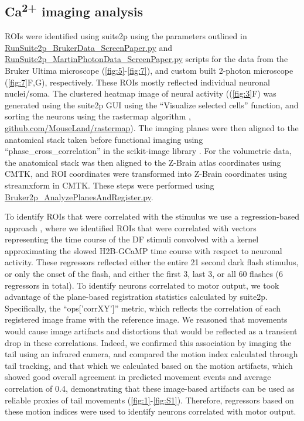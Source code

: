 \documentclass[9pt,lineno]{RandlettLab_elife}
\begin{document}
\subsection{Ca\textsuperscript{2+} imaging analysis}

ROIs were identified using suite2p \citep{Pachitariu2017-ad} using the parameters outlined in 
\\ \href{https://github.com/owenrandlett/lamire_2022/blob/main/RunSuite2p_BrukerData_ScreenPaper.py}{RunSuite2p\_BrukerData\_ScreenPaper.py} and  \href{https://github.com/owenrandlett/lamire_2022/blob/main/RunSuite2p_MartinPhotonData_ScreenPaper.py}{RunSuite2p\_MartinPhotonData\_ScreenPaper.py} scripts for the data from the Bruker Ultima microscope (\autoref{fig:5}-\autoref{fig:7}), and custom built 2-photon microscope (\autoref{fig:7}F,G), respectively. These ROIs mostly reflected individual neuronal nuclei/soma. The clustered heatmap image of neural activity ((\autoref{fig:3}F) was generated using the suite2p GUI using the “Visualize selected cells” function, and sorting the neurons using the rastermap algorithm \citep{Pachitariu2017-ad}, \href{https://github.com/MouseLand/rastermap}{github.com/MouseLand/rastermap}). The imaging planes were then aligned to the anatomical stack taken before functional imaging using “phase\_cross\_correlation” in the scikit-image library \citep{Van_der_Walt2014-hx}. For the volumetric data, the anatomical stack was then aligned to the Z-Brain atlas coordinates using CMTK, and ROI coordinates were transformed into Z-Brain coordinates using streamxform in CMTK. These steps were performed using \href{https://github.com/owenrandlett/lamire_2022/blob/main/Bruker2p_AnalyzePlanesAndRegister.py}{Bruker2p\_AnalyzePlanesAndRegister.py}. 

To identify ROIs that were correlated with the stimulus we use a regression-based approach \citep{Miri2011-nl}, where we identified ROIs that were correlated with vectors representing the time course of the DF stimuli convolved with a kernel approximating the slowed H2B-GCaMP time course with respect to neuronal activity. These regressors reflected either the entire 21 second dark flash stimulus, or only the onset of the flash, and either the first 3, last 3, or all 60 flashes (6 regressors in total). To identify neurons correlated to motor output, we took advantage of the plane-based registration statistics calculated by suite2p. Specifically, the “ops['corrXY']” metric, which reflects the correlation of each registered image frame with the reference image. We reasoned that movements would cause image artifacts and distortions that would be reflected as a transient drop in these correlations. Indeed, we confirmed this association by imaging the tail using an infrared camera, and compared the motion index calculated through tail tracking, and that which we calculated based on the motion artifacts, which showed good overall agreement in predicted movement events and average correlation of 0.4, demonstrating that these image-based artifacts can be used as reliable proxies of tail movements (\autoref{fig:1}-\autoref{fig:S1}). Therefore, regressors based on these motion indices were used to identify neurons correlated with motor output. 
\end{document}
